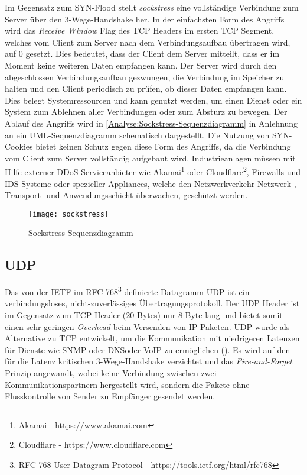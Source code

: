 Im Gegensatz zum SYN-Flood stellt \textit{sockstress} eine vollständige Verbindung zum Server über den 3-Wege-Handshake her. In der einfachsten Form des Angriffs wird das \textit{Receive Window} Flag des \ac{TCP} Headers im ersten \ac{TCP} Segment, welches vom Client zum Server nach dem Verbindungsaufbau übertragen wird, auf 0 gesetzt. Dies bedeutet, dass der Client dem Server mitteilt, dass er im Moment keine weiteren Daten empfangen kann. Der Server wird durch den abgeschlossen Verbindungsaufbau gezwungen, die Verbindung im Speicher zu halten und den Client periodisch zu prüfen, ob dieser Daten empfangen kann. Dies belegt Systemressourcen und kann genutzt werden, um einen Dienst oder ein System zum Ablehnen aller Verbindungen oder zum Absturz zu bewegen. Der Ablauf des Angriffs wird in \autoref{Analyse:Sockstress-Sequenzdiagramm} in Anlehnung an ein \ac{UML}-Sequenzdiagramm schematisch dargestellt. Die Nutzung von SYN-Cookies bietet keinen Schutz gegen diese Form des Angriffs, da die Verbindung vom Client zum Server vollständig aufgebaut wird. Industrieanlagen müssen mit Hilfe externer \ac{DDoS} Serviceanbieter wie Akamai\footnote{Akamai - https://www.akamai.com} oder Cloudflare\footnote{Cloudflare - https://www.cloudflare.com}, Firewalls und \ac{IDS} Systeme oder spezieller Appliances, welche den Netzwerkverkehr Netzwerk-, Transport- und Anwendungsschicht überwachen, geschützt werden.

\begin{figure}[h]
  \centering
  \texttt{[image: sockstress]}
  \caption{Sockstress Sequenzdiagramm}
  \label{Analyse:Sockstress-Sequenzdiagramm}
\end{figure}

\subsection{\ac{UDP}}
Das von der \ac{IETF} im \ac{RFC} 768\footnote{RFC 768 User Datagram Protocol - https://tools.ietf.org/html/rfc768} definierte Datagramm \ac{UDP} ist ein verbindungsloses, nicht-zuverlässiges Übertragungsprotokoll. Der \ac{UDP} Header ist im Gegensatz zum \ac{TCP} Header (20 Bytes) nur 8 Byte lang und bietet somit einen sehr geringen \textit{Overhead} beim Versenden von \ac{IP} Paketen. \ac{UDP} wurde als Alternative zu \ac{TCP} entwickelt, um die Kommunikation mit niedrigeren Latenzen für Dienste wie \ac{SNMP} oder \ac{DNS}oder \ac{VoIP} zu ermöglichen (\cite{UDP2003}). Es wird auf den für die Latenz kritischen 3-Wege-Handshake verzichtet und das \textit{Fire-and-Forget} Prinzip angewandt, wobei keine Verbindung zwischen zwei Kommunikationspartnern hergestellt wird, sondern die Pakete ohne Flusskontrolle von Sender zu Empfänger gesendet werden.

